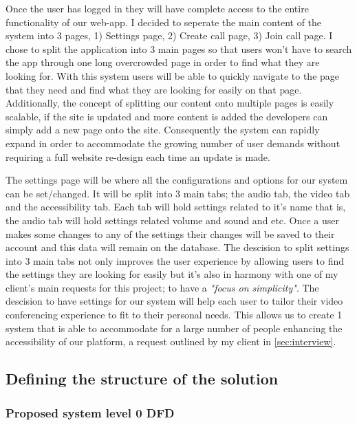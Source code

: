 Once the user has logged in they will have complete access to 
the entire functionality of our web-app. I decided to seperate
the main content of the system into 3 pages, 1) Settings page,
2) Create call page, 3) Join call page. I chose to split the 
application into 3 main pages so that users won't have to 
search the app through one long overcrowded page in order to 
find what they are looking for. With this system users will be
able to quickly navigate to the page that they need and find 
what they are looking for easily on that page. Additionally, 
the concept of splitting our content onto multiple pages is 
easily scalable, if the site is updated and more content is 
added the developers can simply add a new page onto the site.
Consequently the system can rapidly expand in order to 
accommodate the growing number of user demands without
requiring a full website re-design each time an update is 
made. \\ \vspace{0.2cm}

The settings page will be where all the configurations and 
options for our system can be set/changed. It will be split
into 3 main tabs; the audio tab, the video tab and the 
accessibility tab. Each tab will hold settings related to it's
name that is, the audio tab will hold settings related volume
and sound and etc. Once a user makes some changes to any of the
settings their changes will be saved to their account and this 
data will remain on the database. The descision to split 
settings into 3 main tabs not only improves the user experience
by allowing users to find the settings they are looking for
easily but it's also in harmony with one of my client's main 
requests for this project; to have a \textit{"focus on 
simplicity"}. The descision to have settings for our system
will help each user to tailor their video conferencing
experience to fit to their personal needs. This allows us to 
create 1 system that is able to accommodate for a large 
number of people enhancing the accessibility of our platform, 
a request outlined by my client in \ref{sec:interview}. 

\newpage
\subsection{Defining the structure of the solution}

\subsubsection{Proposed system level 0 DFD}

